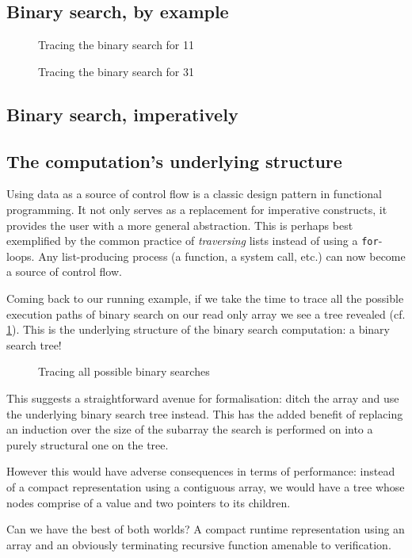 \documentclass{article}
\begin{document}
\subsection{Binary search, by example}

\begin{figure}
  \center
  \caption{Tracing the binary search for 11}
\end{figure}

\begin{figure}
  \center
  \caption{Tracing the binary search for 31}
\end{figure}

\subsection{Binary search, imperatively}



\subsection{The computation's underlying structure}

Using data as a source of control flow is a classic design pattern in functional
programming. It not only serves as a replacement for imperative constructs, it
provides the user with a more general abstraction. This is perhaps best exemplified
by the common practice of \emph{traversing}
lists instead of using a \texttt{for}-loops. Any list-producing process (a function,
a system call, etc.) can now become a source of control flow.

Coming back to our running example, if we take the time to trace all the possible
execution paths of binary search on our read only array we see a tree revealed
(cf. \cref{fig:searchall}).
This is the underlying structure of the binary search computation: a binary search
tree! 

\begin{figure}
  \center
  \caption{Tracing all possible binary searches}
  \label{fig:searchall}
\end{figure}

This suggests a straightforward avenue for formalisation: ditch the array and
use the underlying binary search tree instead. This has the added benefit of
replacing an induction over the size of the subarray the search is performed on
into a purely structural one on the tree.

However this would have adverse consequences in terms of performance: instead of
a compact representation using a contiguous array, we would have a tree whose nodes
comprise of a value and two pointers to its children.

Can we have the best of both worlds? A compact runtime representation using an
array and an obviously terminating recursive function amenable to verification.

\section{}



\end{document}
